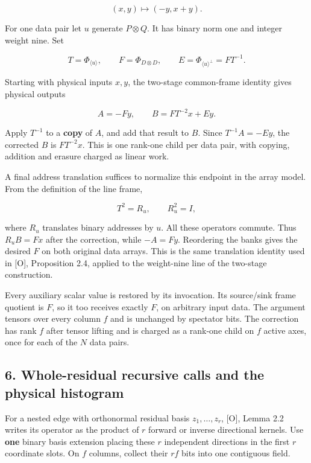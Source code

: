 \documentclass[
  11pt,
]{article}
\begin{document}
\[
 (x,y)\longmapsto(-y,x+y).
\]

For one data pair let \(u\) generate \(P\otimes Q\). It has binary norm
one and integer weight nine. Set

\[
 T=\Phi_{\langle u\rangle},\qquad F=\Phi_{D\otimes D},\qquad
 E=\Phi_{\langle u\rangle^\perp}=FT^{-1}.
\]

Starting with physical inputs \(x,y\), the two-stage common-frame
identity gives physical outputs

\[
 A=-Fy,\qquad B=FT^{-2}x+Ey.
 \tag{5.1}
\]

Apply \(T^{-1}\) to a \textbf{copy} of \(A\), and add that result to
\(B\). Since \(T^{-1}A=-Ey\), the corrected \(B\) is \(FT^{-2}x\). This
is one rank-one child per data pair, with copying, addition and erasure
charged as linear work.

A final address translation suffices to normalize this endpoint in the
array model. From the definition of the line frame,

\[
 T^2=R_u,\qquad R_u^2=I,
\]

where \(R_u\) translates binary addresses by \(u\). All these operators
commute. Thus \(R_uB=Fx\) after the correction, while \(-A=Fy\).
Reordering the banks gives the desired \(F\) on both original data
arrays. This is the same translation identity used in {[}O{]},
Proposition 2.4, applied to the weight-nine line of the two-stage
construction.

Every auxiliary scalar value is restored by its invocation. Its
source/sink frame quotient is \(F\), so it too receives exactly \(F\),
on arbitrary input data. The argument tensors over every column \(f\)
and is unchanged by spectator bits. The correction has rank \(f\) after
tensor lifting and is charged as a rank-one child on \(f\) active axes,
once for each of the \(N\) data pairs.

\subsection{6. Whole-residual recursive calls and the physical
histogram}\label{whole-residual-recursive-calls-and-the-physical-histogram}

For a nested edge with orthonormal residual basis \(z_1,\ldots,z_r\),
{[}O{]}, Lemma 2.2 writes its operator as the product of \(r\) forward
or inverse directional kernels. Use \textbf{one} binary basis extension
placing these \(r\) independent directions in the first \(r\) coordinate
slots. On \(f\) columns, collect their \(rf\) bits into one contiguous
field.
\end{document}
